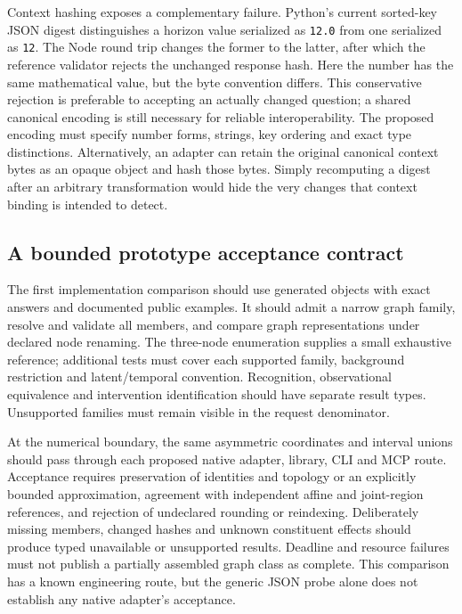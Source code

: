 Context hashing exposes a complementary failure. Python's current sorted-key
JSON digest distinguishes a horizon value serialized as \texttt{12.0} from
one serialized as \texttt{12}. The Node round trip changes the former to the
latter, after which the reference validator rejects the unchanged response
hash. Here the number has the same mathematical value, but the byte convention
differs. This conservative rejection is preferable to accepting an actually
changed question; a shared canonical encoding is still necessary for reliable
interoperability. The proposed encoding must specify number forms, strings,
key ordering and exact type distinctions. Alternatively, an adapter can retain
the original canonical context bytes as an opaque object and hash those bytes.
Simply recomputing a digest after an arbitrary transformation would hide the
very changes that context binding is intended to detect.
\citep{exec16_topology_codec}

\subsection{A bounded prototype acceptance contract}

The first implementation comparison should use generated objects with exact
answers and documented public examples. It should admit a narrow graph family,
resolve and validate all members, and compare graph representations under
declared node renaming. The three-node enumeration supplies a small exhaustive
reference; additional tests must cover each supported family, background
restriction and latent/temporal convention. Recognition, observational
equivalence and intervention identification should have separate result types.
Unsupported families must remain visible in the request denominator.

At the numerical boundary, the same asymmetric coordinates and interval unions
should pass through each proposed native adapter, library, CLI and MCP route.
Acceptance requires preservation of identities and topology or an explicitly
bounded approximation, agreement with independent affine and joint-region
references, and rejection of undeclared rounding or reindexing. Deliberately
missing members, changed hashes and unknown constituent effects should produce
typed unavailable or unsupported results. Deadline and resource failures must
not publish a partially assembled graph class as complete. This comparison
has a known engineering route, but the generic JSON probe alone does not
establish any native adapter's acceptance.
\citep{exec16_topology_contract}


